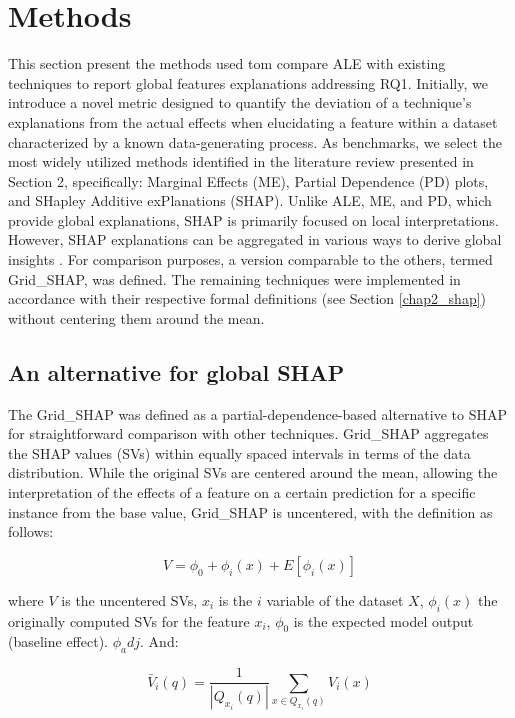 \section{Methods}

This section present the methods used tom compare ALE with existing techniques to report global features explanations addressing RQ1. Initially, we introduce a novel metric designed to quantify the deviation of a technique's explanations from the actual effects when elucidating a feature within a dataset characterized by a known data-generating process. As benchmarks, we select the most widely utilized methods identified in the literature review presented in Section 2, specifically: Marginal Effects (ME), Partial Dependence (PD) plots, and SHapley Additive exPlanations (SHAP). Unlike ALE, ME, and PD, which provide global explanations, SHAP is primarily focused on local interpretations. However, SHAP explanations can be aggregated in various ways to derive global insights \cite{Lundberg2020FromTrees.}. For comparison purposes, a version comparable to the others, termed Grid\_SHAP, was defined. The remaining techniques were implemented in accordance with their respective formal definitions (see Section \ref{chap2_shap}) without centering them around the mean.


\subsection{An alternative for global SHAP}

The Grid\_SHAP was defined as a partial-dependence-based alternative to SHAP for straightforward comparison with other techniques. Grid\_SHAP aggregates the SHAP values (SVs) within equally spaced intervals in terms of the data distribution. While the original SVs are centered around the mean, allowing the interpretation of the effects of a feature on a certain prediction for a specific instance from the base value, Grid\_SHAP is uncentered, with the definition as follows:

\begin{equation}
 V = \phi_0 + \phi_i(x) + E[\phi_i(x)]
\label{shapley_1}
\end{equation}

where \(V\) is the uncentered SVs, $x_i$ is the $i$ variable of the dataset $X$, $\phi_i(x)$ the originally computed SVs for the feature $x_i$, $\phi_0$ is the expected model output (baseline effect).  $\phi_adj$. And:

\begin{equation}
\bar{V}_{i}(q) = \frac{1}{|Q_{x_i}(q)|} \sum_{x \in Q_{x_i}(q)} V_i(x)
\label{gridShap}
\end{equation}

